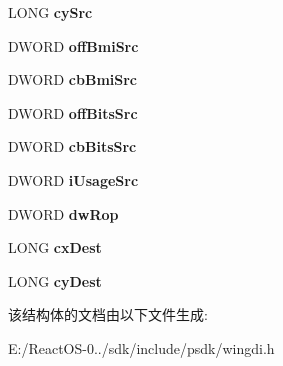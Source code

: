 \begin{DoxyCompactItemize}
\mbox{\label{structtag_e_m_r_s_t_r_e_t_c_h_d_i_b_i_t_s_a7c41fed985f79ccf163a22e0a4e3ffa2}} 
L\+O\+NG {\bfseries cy\+Src}
\item 
\mbox{\label{structtag_e_m_r_s_t_r_e_t_c_h_d_i_b_i_t_s_a187a9e1e736fa7be8882625fe1b3a111}} 
D\+W\+O\+RD {\bfseries off\+Bmi\+Src}
\item 
\mbox{\label{structtag_e_m_r_s_t_r_e_t_c_h_d_i_b_i_t_s_ab3d3f50c0cb0a347b624e4370479c0bc}} 
D\+W\+O\+RD {\bfseries cb\+Bmi\+Src}
\item 
\mbox{\label{structtag_e_m_r_s_t_r_e_t_c_h_d_i_b_i_t_s_a8fc53e1bdbfc704bf67511b7fa3707f4}} 
D\+W\+O\+RD {\bfseries off\+Bits\+Src}
\item 
\mbox{\label{structtag_e_m_r_s_t_r_e_t_c_h_d_i_b_i_t_s_ab0b5cc7ff8c84c624ac4f204fcf8fcb4}} 
D\+W\+O\+RD {\bfseries cb\+Bits\+Src}
\item 
\mbox{\label{structtag_e_m_r_s_t_r_e_t_c_h_d_i_b_i_t_s_a2da52c8ac6e1ec3c0c0ca6c912aaf5fa}} 
D\+W\+O\+RD {\bfseries i\+Usage\+Src}
\item 
\mbox{\label{structtag_e_m_r_s_t_r_e_t_c_h_d_i_b_i_t_s_a6d288bf7c61ca573993d3c026adb1358}} 
D\+W\+O\+RD {\bfseries dw\+Rop}
\item 
\mbox{\label{structtag_e_m_r_s_t_r_e_t_c_h_d_i_b_i_t_s_ae29b00e3ae329e1398d012d301ea1645}} 
L\+O\+NG {\bfseries cx\+Dest}
\item 
\mbox{\label{structtag_e_m_r_s_t_r_e_t_c_h_d_i_b_i_t_s_a66b0fd17190ea5942ca254657bff0265}} 
L\+O\+NG {\bfseries cy\+Dest}
\end{DoxyCompactItemize}


该结构体的文档由以下文件生成\+:\begin{DoxyCompactItemize}
\item 
E\+:/\+React\+O\+S-\/0../sdk/include/psdk/wingdi.\+h\end{DoxyCompactItemize}
